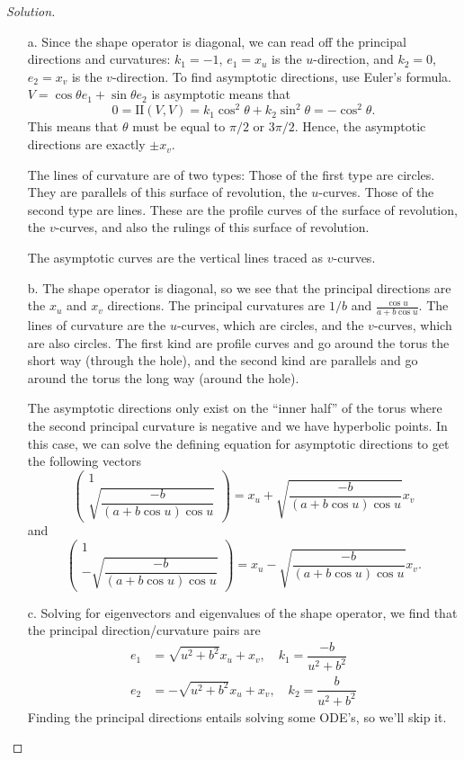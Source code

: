 \documentclass[Shifrin_Solutions_Spring_2015]{subfiles}
\begin{document}
\begin{proof}[Solution]
\begin{itemize}
\item[a.] Since the shape operator is diagonal, we can read off the principal directions and curvatures: $k_1 = -1$, $e_1 = x_u$ is the $u$-direction, and $k_2 = 0$, $e_2 = x_v$ is the $v$-direction. To find asymptotic directions, use Euler's formula. $V=\cos \theta e_1 + \sin\theta e_2$ is asymptotic means that
\[
0 = \mathrm{II}(V,V) = k_1 \cos^2 \theta + k_2 \sin^2 \theta = -\cos^2 \theta.
\]
This means that $\theta$ must be equal to $\pi/2$ or $3\pi/2$. Hence, the asymptotic directions are exactly $\pm x_v$.

The lines of curvature are of two types: Those of the first type are circles. They are parallels of this surface of revolution, the $u$-curves. Those of the second type are lines. These are the profile curves of the surface of revolution, the $v$-curves, and also the rulings of this surface of revolution.

The asymptotic curves are the vertical lines traced as $v$-curves.\\


\item[b.] The shape operator is diagonal, so we see that the principal directions are the $x_u$ and $x_v$ directions. The principal curvatures are $1/b$ and $\frac{\cos u}{a+b\cos u}$. The lines of curvature are the $u$-curves, which are circles, and the $v$-curves, which are also circles. The first kind are profile curves and go around the torus the short way (through the hole), and the second kind are parallels and go around the torus the long way (around the hole).

The asymptotic directions only exist on the ``inner half'' of the torus where the second principal curvature is negative and we have hyperbolic points. In this case, we can solve the defining equation for asymptotic directions to get the following vectors
\[
\begin{pmatrix} 1 \\ \sqrt{\dfrac{-b}{(a+b\cos u) \cos u}} \end{pmatrix} = x_u + \sqrt{\dfrac{-b}{(a+b\cos u) \cos u}} x_v
\]
and
\[
\begin{pmatrix} 1 \\ -\sqrt{\dfrac{-b}{(a+b\cos u) \cos u}}\end{pmatrix} = x_u -\sqrt{\dfrac{-b}{(a+b\cos u) \cos u}} x_v .
\]

\item[c.] Solving for eigenvectors and eigenvalues of the shape operator, we find that the principal direction/curvature pairs are
\begin{align*}
e_1 &= \sqrt{u^2+b^2} x_u + x_v, \quad k_1 = \dfrac{-b}{u^2+b^2} \\
e_2 &= -\sqrt{u^2+b^2} x_u + x_v, \quad k_2 = \dfrac{b}{u^2+b^2}
\end{align*}
Finding the principal directions entails solving some ODE's, so we'll skip it.


\end{itemize}
\end{proof}
\end{document}
